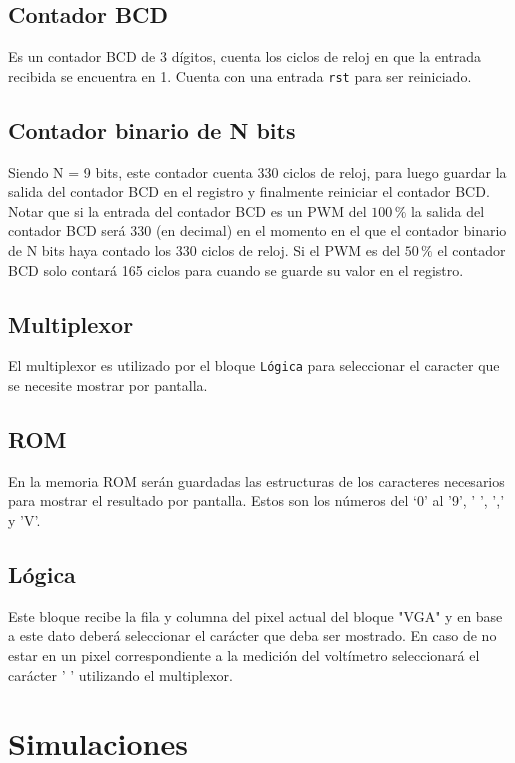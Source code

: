 \documentclass[10pt,spanish,a4paper,openany,notitlepage]{article}
\begin{document}
\subsection{Contador BCD}

Es un contador BCD de 3 dígitos, cuenta los ciclos de reloj en que
la entrada recibida se encuentra en 1.
Cuenta con una entrada \texttt{rst} para ser reiniciado.

\subsection{Contador binario de N bits}

Siendo N = 9 bits, este contador cuenta 330 ciclos de reloj, para luego
guardar la salida del contador BCD en el registro y finalmente reiniciar
el contador BCD.
Notar que si la entrada del contador BCD es un PWM del $100\,\unit{\%}$
la salida del contador BCD será 330 (en decimal) en el momento en el que
el contador binario de N bits haya contado los 330 ciclos de reloj.
Si el PWM es del $50\,\unit{\%}$ el contador BCD solo contará 165 ciclos
para cuando se guarde su valor en el registro.

\subsection{Multiplexor}

El multiplexor es utilizado por el bloque \texttt{Lógica} para seleccionar
el caracter que se necesite mostrar por pantalla.

\subsection{ROM}

En la memoria ROM serán guardadas las estructuras de los caracteres
necesarios para mostrar el resultado por pantalla. Estos son los números
del `0' al '9', ' ', ',' y 'V'.

\subsection{Lógica}

Este bloque recibe la fila y columna del pixel actual del bloque "VGA"
y en base a este dato deberá seleccionar el carácter que deba ser mostrado.
En caso de no estar en un pixel correspondiente a la medición del voltímetro
seleccionará el carácter ' ' utilizando el multiplexor.

\section{Simulaciones}
\end{document}
